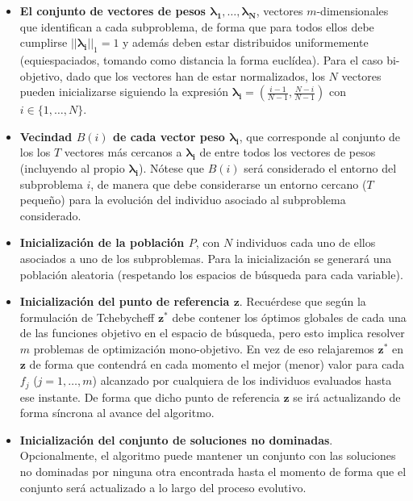 \begin{itemize}
    \item \textbf{El conjunto de vectores de pesos $\boldsymbol{\lambda_1}, \dots, \boldsymbol{\lambda_N}$}, vectores $m$-dimensionales que identifican a cada subproblema, de forma que para todos ellos debe cumplirse $||\boldsymbol{\lambda_{i}}||_{1} = 1$ y además deben estar distribuidos uniformemente (equiespaciados, tomando como distancia la forma euclídea). Para el caso bi-objetivo, dado que los vectores han de estar normalizados, los $N$ vectores pueden inicializarse siguiendo la expresión $\boldsymbol{\lambda_i} = \left(\frac{i-1}{N-1}, \frac{N-i}{N-1} \right)$ con $i \in \{1, \dots, N\}$.\\
    
    \item \textbf{Vecindad $B(i)$ de cada vector peso $\boldsymbol{\lambda_i}$}, que corresponde al conjunto de los  los $T$ vectores más cercanos a $\boldsymbol{\lambda_i}$ de entre todos los vectores de pesos (incluyendo al propio $\boldsymbol{\lambda_i}$). Nótese que $B(i)$ será considerado el entorno del subproblema $i$, de manera que debe considerarse un entorno cercano ($T$ pequeño) para la evolución del individuo asociado al subproblema considerado.\\

    
    \item \textbf{Inicialización de la población $P$}, con $N$ individuos cada uno de ellos asociados a uno de los subproblemas. Para la inicialización se generará una población aleatoria (respetando los espacios de búsqueda para cada variable). \\

    \item \textbf{Inicialización del punto de referencia $\boldsymbol{z}$}. Recuérdese que según la formulación de Tchebycheff $\boldsymbol{z}^{*}$ debe contener los óptimos globales de cada una de las funciones objetivo en el espacio de búsqueda, pero esto implica resolver $m$ problemas de optimización mono-objetivo. En vez de eso relajaremos $\boldsymbol{z^{*}}$ en $\boldsymbol{z}$ de forma que contendrá en cada momento el mejor (menor) valor para cada $f_j$ ($j = 1, \dots, m$) alcanzado por cualquiera de los individuos evaluados hasta ese instante. De forma que dicho punto de referencia $\boldsymbol{z}$ se irá actualizando de forma síncrona al avance del algoritmo.\\
    
    \item \textbf{Inicialización del conjunto de soluciones no dominadas}. Opcionalmente, el algoritmo puede mantener un conjunto con las soluciones no dominadas por ninguna otra encontrada hasta el momento de forma que el conjunto será actualizado a lo largo del proceso evolutivo.\\
\end{itemize}

